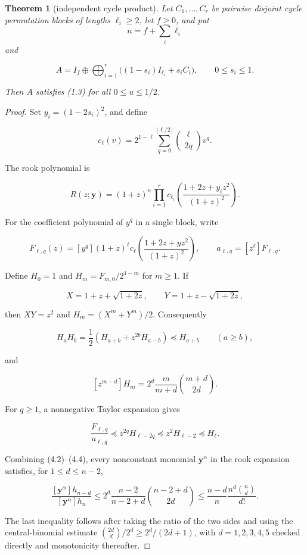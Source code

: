 \documentclass[11pt]{article}
\newtheorem{theorem}{Theorem}[section]
\begin{document}
\Needspace{0.18\textheight}
\begin{theorem}[independent cycle product]

Let $C_1,\ldots,C_r$ be pairwise disjoint cycle permutation blocks of
lengths $\ell_i\ge2$, let $f\ge0$, and put
\[
n=f+\sum_i\ell_i
\]
and

\[
A=I_f\oplus\bigoplus_{i=1}^r\bigl((1-s_i)I_{\ell_i}+s_iC_i\bigr),
\qquad 0\le s_i\le1.
\]

Then $A$ satisfies (1.3) for all $0\le u\le1/2$.

\end{theorem}

\begin{proof}


Set $y_i=(1-2s_i)^2$, and define

\[
c_\ell(v)=2^{1-\ell}\sum_{q=0}^{\lfloor\ell/2\rfloor}\binom\ell{2q}v^q.
\]

The rook polynomial is

\[
R(z;\mathbf y)=(1+z)^n\prod_{i=1}^r
c_{\ell_i}\!\left(\frac{1+2z+y_iz^2}{(1+z)^2}\right). \tag{4.1}
\]

For the coefficient polynomial of $y^q$ in a single block, write

\[
F_{\ell,q}(z)=[y^q](1+z)^\ell
c_\ell\!\left(\frac{1+2z+yz^2}{(1+z)^2}\right),
\qquad a_{\ell,q}=[z^\ell]F_{\ell,q}.
\]

Define $H_0=1$ and $H_m=F_{m,0}/2^{1-m}$ for $m\ge1$.  If

\[
X=1+z+\sqrt{1+2z},\qquad Y=1+z-\sqrt{1+2z},
\]

then $XY=z^2$ and $H_m=(X^m+Y^m)/2$.  Consequently

\[
H_aH_b=\frac12\left(H_{a+b}+z^{2b}H_{a-b}\right)\preceq H_{a+b}
\qquad(a\ge b), \tag{4.2}
\]

and

\[
[z^{m-d}]H_m=2^d\frac{m}{m+d}\binom{m+d}{2d}. \tag{4.3}
\]

For $q\ge1$, a nonnegative Taylor expansion gives

\[
\frac{F_{\ell,q}}{a_{\ell,q}}
\preceq z^{2q}H_{\ell-2q}\preceq z^2H_{\ell-2}\preceq H_\ell. \tag{4.4}
\]

Combining (4.2)--(4.4), every nonconstant monomial
$\mathbf y^\alpha$ in the rook expansion satisfies, for $1\le d\le n-2$,

\[
\frac{[\mathbf y^\alpha]h_{n-d}}
{[\mathbf y^\alpha]h_n}
\le 2^d\frac{n-2}{n-2+d}\binom{n-2+d}{2d}
\le\frac{n-d}{n}\frac{n^d\binom nd}{d!}. \tag{4.5}
\]

The last inequality follows after taking the ratio of the two sides and using the
central-binomial estimate
$\binom{2d}{d}/2^d\ge2^d/(2d+1)$, with $d=1,2,3,4,5$ checked directly and
monotonicity thereafter.


\end{proof}
\end{document}
